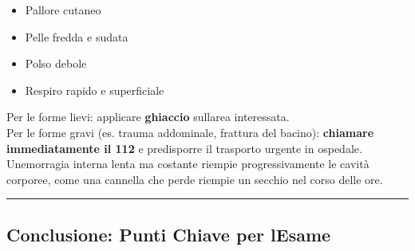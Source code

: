 \documentclass[a4paper,11pt]{article}
\providecommand{\tightlist}{%
  \setlength{\itemsep}{0pt}\setlength{\parskip}{0pt}}
\begin{document}
\begin{itemize}
      \tightlist
      \item
            Pallore cutaneo
      \item
            Pelle fredda e sudata
      \item
            Polso debole
      \item
            Respiro rapido e superficiale
\end{itemize}

Per le forme lievi: applicare \textbf{ghiaccio}
sull\textquotesingle area interessata.\\
Per le forme gravi (es. trauma addominale, frattura del bacino):
\textbf{chiamare immediatamente il 112} e predisporre il trasporto
urgente in ospedale. Un\textquotesingle emorragia interna lenta ma
costante riempie progressivamente le cavità corporee, come una cannella
che perde riempie un secchio nel corso delle ore.

\begin{center}\rule{0.5\linewidth}{0.5pt}\end{center}

\subsection{Conclusione: Punti Chiave per
      l\textquotesingle Esame}\label{conclusione-punti-chiave-per-lesame-3}
\end{document}
